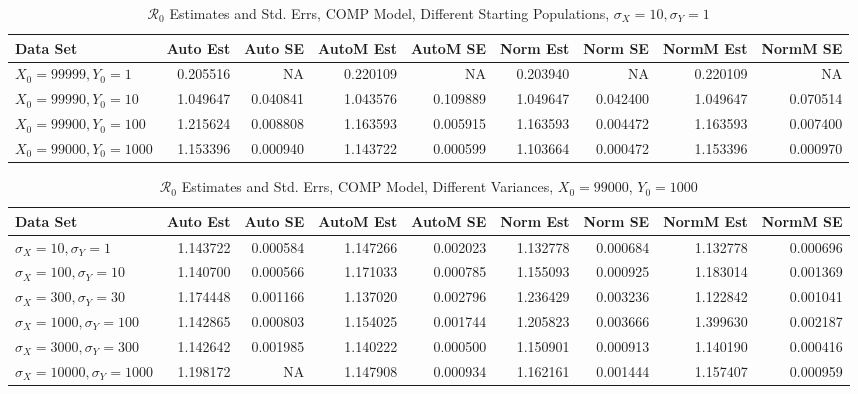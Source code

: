 \documentclass[12pt]{article}
\newcommand{\rr}{\ensuremath{\mathcal{R}_0}}
\begin{document}
\begin{table}[H]
	
	\caption{$\rr$ Estimates and Std. Errs, COMP Model,
		Different Starting Populations, 
		$\sigma_X = 10, \sigma_Y = 1$}
	\begin{footnotesize}
		\hskip -1.7cm
		\begin{tabular}{l|r|r|r|r|r|r|r|r}
			\hline
			Data Set & Auto Est & Auto SE & AutoM Est & AutoM SE & Norm Est & Norm SE & NormM Est & NormM SE\\
			\hline
			$X_0 = 99999, Y_0 = 1$ & 0.205516 & NA & 0.220109 & NA & 0.203940 & NA & 0.220109 & NA\\
			\hline
			$X_0 = 99990, Y_0 = 10$ & 1.049647 & 0.040841 & 1.043576 & 0.109889 & 1.049647 & 0.042400 & 1.049647 & 0.070514\\
			\hline
			$X_0 = 99900, Y_0 = 100$ & 1.215624 & 0.008808 & 1.163593 & 0.005915 & 1.163593 & 0.004472 & 1.163593 & 0.007400\\
			\hline
			$X_0 = 99000, Y_0 = 1000$ & 1.153396 & 0.000940 & 1.143722 & 0.000599 & 1.103664 & 0.000472 & 1.153396 & 0.000970\\
			\hline
		\end{tabular}
	\end{footnotesize}
\end{table}

\begin{table}[H]
	
	\caption{$\rr$ Estimates and Std. Errs, COMP Model, 
		Different Variances, $X_0 = 99000$, $Y_0 = 1000$}
	\begin{footnotesize}
		\hskip -1.7cm
		\begin{tabular}{l|r|r|r|r|r|r|r|r}
			\hline
			Data Set & Auto Est & Auto SE & AutoM Est & AutoM SE & Norm Est & Norm SE & NormM Est & NormM SE\\
			\hline
			$\sigma_X = 10, \sigma_Y = 1$ & 1.143722 & 0.000584 & 1.147266 & 0.002023 & 1.132778 & 0.000684 & 1.132778 & 0.000696\\
			\hline
			$\sigma_X = 100, \sigma_Y = 10$ & 1.140700 & 0.000566 & 1.171033 & 0.000785 & 1.155093 & 0.000925 & 1.183014 & 0.001369\\
			\hline
			$\sigma_X = 300, \sigma_Y = 30$ & 1.174448 & 0.001166 & 1.137020 & 0.002796 & 1.236429 & 0.003236 & 1.122842 & 0.001041\\
			\hline
			$\sigma_X = 1000, \sigma_Y = 100$ & 1.142865 & 0.000803 & 1.154025 & 0.001744 & 1.205823 & 0.003666 & 1.399630 & 0.002187\\
			\hline
			$\sigma_X = 3000, \sigma_Y = 300$ & 1.142642 & 0.001985 & 1.140222 & 0.000500 & 1.150901 & 0.000913 & 1.140190 & 0.000416\\
			\hline
			$\sigma_X = 10000, \sigma_Y = 1000$ & 1.198172 & NA & 1.147908 & 0.000934 & 1.162161 & 0.001444 & 1.157407 & 0.000959\\
			\hline
		\end{tabular}
	\end{footnotesize}
\end{table}
\end{document}

